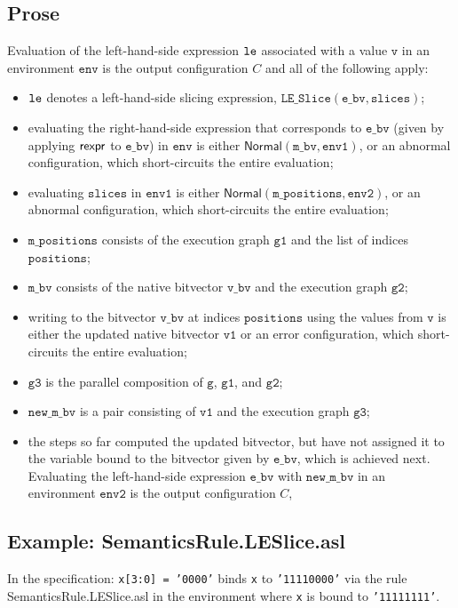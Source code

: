 \documentclass{book}
\newcommand\ProseOrAbnormal[0]{or an abnormal configuration, which short-circuits the entire evaluation}
\newcommand\ProseOrError[0]{or an error configuration, which short-circuits the entire evaluation}
\newcommand\Normal[0]{\textsf{Normal}}
\newcommand\env[0]{\texttt{env}}
\newcommand\envone[0]{\texttt{env1}}
\newcommand\envtwo[0]{\texttt{env2}}
\newcommand\vg[0]{\texttt{g}}
\newcommand\vv[0]{\texttt{v}}
\newcommand\vvone[0]{\texttt{v1}}
\newcommand\vgone[0]{\texttt{g1}}
\newcommand\vgtwo[0]{\texttt{g2}}
\newcommand\vgthree[0]{\texttt{g3}}
\newcommand\ebv[0]{\texttt{e\_bv}}
\newcommand\mbv[0]{\texttt{m\_bv}}
\newcommand\vbv[0]{\texttt{v\_bv}}
\newcommand\mpositions[0]{\texttt{m\_positions}}
\newcommand\slices[0]{\texttt{slices}}
\newcommand\positions[0]{\texttt{positions}}
\newcommand\newmbv[0]{\texttt{new\_m\_bv}}
\begin{document}
  \subsection{Prose}
  Evaluation of the left-hand-side expression $\texttt{le}$ associated with a
  value $\vv$ in an environment $\env$ is the output configuration $C$
  and all of the following apply:
  \begin{itemize}
    \item $\texttt{le}$ denotes a left-hand-side slicing expression, $\texttt{LE\_Slice}(\ebv, \slices)$;
    \item evaluating the right-hand-side expression that corresponds to $\ebv$
    (given by applying $\textsf{rexpr}$ to $\ebv$) in $\env$
      is either $\Normal(\mbv,\envone)$, \ProseOrAbnormal;
    \item evaluating $\slices$ in $\envone$ is either $\Normal(\mpositions, \envtwo)$,
    \ProseOrAbnormal;
    \item $\mpositions$ consists of the execution graph $\vgone$ and the list of indices $\positions$;
    \item $\mbv$ consists of the native bitvector $\vbv$ and the execution graph $\vgtwo$;
    \item writing to the bitvector $\vbv$ at indices $\positions$ using the values from $\vv$
    is either the updated native bitvector $\vvone$ \ProseOrError;
    \item $\vgthree$ is the parallel composition of $\vg$, $\vgone$, and $\vgtwo$;
    \item $\newmbv$ is a pair consisting of $\vvone$ and the execution graph $\vgthree$;
    \item the steps so far computed the updated bitvector, but have not assigned it to the
    variable bound to the bitvector given by $\ebv$, which is achieved next.
    Evaluating the left-hand-side expression $\ebv$ with
    $\newmbv$ in an environment $\envtwo$ is the output configuration $C$,
  \end{itemize}

   \subsection{Example: SemanticsRule.LESlice.asl}
   In the specification:
   \texttt{x[3:0] = '0000'} binds \texttt{x} to \texttt{'11110000'}
   via the rule SemanticsRule.LESlice.asl
   in the environment where \texttt{x} is bound to \texttt{'11111111'}.
\end{document}
